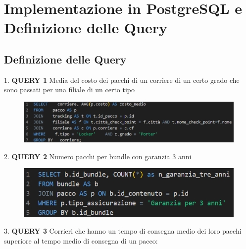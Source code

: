 \section{Implementazione in PostgreSQL e Definizione
delle Query}

\subsection{Definizione delle Query}

1. \textbf{QUERY 1} Media del costo dei pacchi di un corriere di un certo grado che sono passati per una filiale di un certo tipo
  \begin{figure}[H]
\centering
\includegraphics[width=1 \textwidth]{Resources/QUERY1.png}
\label{ML}
\end{figure}
2. \textbf{QUERY 2} Numero pacchi per bundle con garanzia 3 anni
\begin{figure}[H]
\centering
\includegraphics[width=1 \textwidth]{Resources/QUERY2.png}
\label{ML}
\end{figure}
3. \textbf{QUERY 3} Corrieri che hanno un tempo di consegna medio dei loro pacchi superiore al tempo medio di consegna di un pacco:
